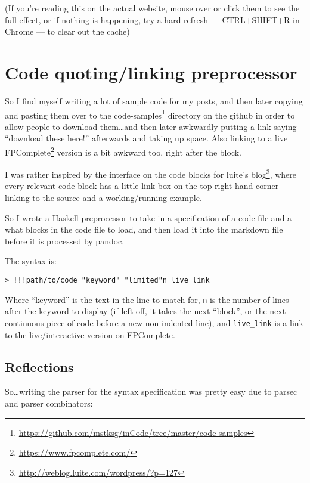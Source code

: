\documentclass[]{article}
\renewcommand{\href}[2]{#2\footnote{\url{#1}}}
\begin{document}
(If you're reading this on the actual website, mouse over or click them
to see the full effect, or if nothing is happening, try a hard refresh
--- CTRL+SHIFT+R in Chrome --- to clear out the cache)

\section{Code quoting/linking
preprocessor}\label{code-quotinglinking-preprocessor}

So I find myself writing a lot of sample code for my posts, and then
later copying and pasting them over to the
\href{https://github.com/mstksg/inCode/tree/master/code-samples}{code-samples}
directory on the github in order to allow people to download
them\ldots{}and then later awkwardly putting a link saying ``download
these here!'' afterwards and taking up space. Also linking to a live
\href{https://www.fpcomplete.com/}{FPComplete} version is a bit awkward
too, right after the block.

I was rather inspired by the interface on the code blocks for
\href{http://weblog.luite.com/wordpress/?p=127}{luite's blog}, where
every relevant code block has a little link box on the top right hand
corner linking to the source and a working/running example.

So I wrote a Haskell preprocessor to take in a specification of a code
file and a what blocks in the code file to load, and then load it into
the markdown file before it is processed by pandoc.

The syntax is:

\begin{verbatim}
> !!!path/to/code "keyword" "limited"n live_link
\end{verbatim}

Where ``keyword'' is the text in the line to match for, \texttt{n} is
the number of lines after the keyword to display (if left off, it takes
the next ``block'', or the next continuous piece of code before a new
non-indented line), and \texttt{live\_link} is a link to the
live/interactive version on FPComplete.

\subsection{Reflections}\label{reflections}

So\ldots{}writing the parser for the syntax specification was pretty
easy due to parsec and parser combinators:
\end{document}
